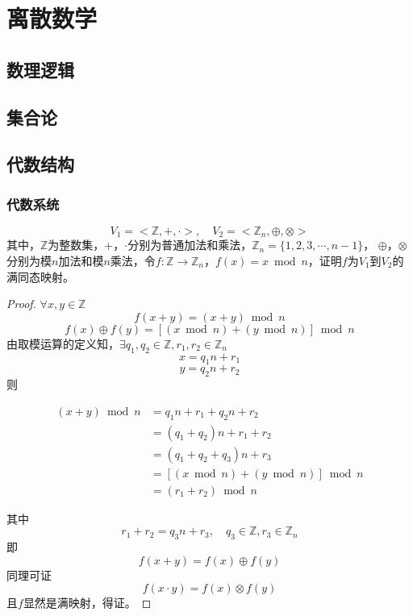 \chapter{离散数学}

\section{数理逻辑}

\section{集合论}

\section{代数结构}

\subsection{代数系统}

\begin{proposition}

    $$V_1 = <\mathbb{Z}, +, \cdot>, \quad V_2 = <\mathbb{Z}_n, \oplus, \otimes>$$
    其中，$\mathbb{Z}$为整数集，$+$，$\cdot$分别为普通加法和乘法，$\mathbb{Z}_n = \{1, 2, 3, \cdots, n - 1\}$，
    $\oplus$，$\otimes$分别为模$n$加法和模$n$乘法，令$f: \mathbb{Z} \to \mathbb{Z}_n$，$f(x) = x \bmod{n}$，证明$f$为$V_1$到$V_2$的满同态映射。

\end{proposition}

\begin{proof}

    $\forall x, y \in \mathbb{Z}$
    $$f(x + y) = (x + y) \bmod{n}$$
    $$f(x) \oplus f(y) = [(x \bmod{n}) + (y \bmod{n})] \bmod{n}$$
    由取模运算的定义知，$\exists q_1, q_2 \in \mathbb{Z}, r_1, r_2 \in \mathbb{Z}_n$
    $$x = q_1 n + r_1$$
    $$y = q_2 n + r_2$$
    则
    
    \begin{align*}
        (x + y) \bmod{n} & =  q_1 n + r_1 + q_2 n + r_2 \\
        & = (q_1 + q_2)n + r_1 + r_2 \\
        & = (q_1 + q_2 + q_3)n + r_3 \\
        & = [(x \bmod{n}) + (y \bmod{n})] \bmod{n} \\
        & = (r_1 + r_2) \bmod{n}
    \end{align*}

    其中
    $$r_1 + r_2 = q_3 n + r_3,\quad q_3 \in \mathbb{Z}, r_3 \in \mathbb{Z}_n$$
    即
    $$f(x + y) = f(x) \oplus f(y)$$
    同理可证
    $$f(x \cdot y) = f(x) \otimes f(y)$$
    且$f$显然是满映射，得证。

\end{proof}

